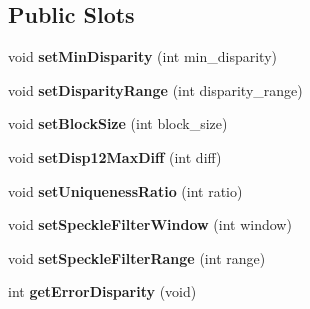 \subsection*{Public Slots}
\begin{DoxyCompactItemize}
\item 
\hypertarget{class_matcher_open_c_v_s_g_b_m_aeda34d7537939c8feb1bd085b37333e9}{}void {\bfseries set\+Min\+Disparity} (int min\+\_\+disparity)\label{class_matcher_open_c_v_s_g_b_m_aeda34d7537939c8feb1bd085b37333e9}

\item 
\hypertarget{class_matcher_open_c_v_s_g_b_m_a7b8de74c1ba55bd10127145fe0f135e9}{}void {\bfseries set\+Disparity\+Range} (int disparity\+\_\+range)\label{class_matcher_open_c_v_s_g_b_m_a7b8de74c1ba55bd10127145fe0f135e9}

\item 
\hypertarget{class_matcher_open_c_v_s_g_b_m_afb8e186fd35dc7830afbea0f525025e7}{}void {\bfseries set\+Block\+Size} (int block\+\_\+size)\label{class_matcher_open_c_v_s_g_b_m_afb8e186fd35dc7830afbea0f525025e7}

\item 
\hypertarget{class_matcher_open_c_v_s_g_b_m_a27a251f5645a7ebc813290aec5b2fea6}{}void {\bfseries set\+Disp12\+Max\+Diff} (int diff)\label{class_matcher_open_c_v_s_g_b_m_a27a251f5645a7ebc813290aec5b2fea6}

\item 
\hypertarget{class_matcher_open_c_v_s_g_b_m_a9e7548ef4d0e13312aa2e0836e8714af}{}void {\bfseries set\+Uniqueness\+Ratio} (int ratio)\label{class_matcher_open_c_v_s_g_b_m_a9e7548ef4d0e13312aa2e0836e8714af}

\item 
\hypertarget{class_matcher_open_c_v_s_g_b_m_a66e9c8a8087464e291a90c5b0dd9e795}{}void {\bfseries set\+Speckle\+Filter\+Window} (int window)\label{class_matcher_open_c_v_s_g_b_m_a66e9c8a8087464e291a90c5b0dd9e795}

\item 
\hypertarget{class_matcher_open_c_v_s_g_b_m_a8d6cb3200204af80a2f7ef228b51526e}{}void {\bfseries set\+Speckle\+Filter\+Range} (int range)\label{class_matcher_open_c_v_s_g_b_m_a8d6cb3200204af80a2f7ef228b51526e}

\item 
\hypertarget{class_matcher_open_c_v_s_g_b_m_a96524a760c1bb475e8bf306db7d39c66}{}int {\bfseries get\+Error\+Disparity} (void)\label{class_matcher_open_c_v_s_g_b_m_a96524a760c1bb475e8bf306db7d39c66}


\end{DoxyCompactItemize}
